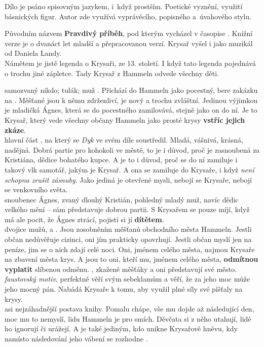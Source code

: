 \documentclass[FGBook.tex]{subfiles}
\begin{document}


\noindent Dílo je psáno spisovným jazykem, i~když prostším.
Poetické vyznění, využití básnických figur.
Autor zde využívá vyprávěcího, popisného a~úvahového stylu.

\noindent Původním názvem \textbf{Pravdivý příběh}, pod kterým vycházel v časopise .
Knižní verze je o dvanáct let mladší a přepracovanou verzí.
Krysař vyšel i jako muzikál od Daniela Landy. \\
Námětem je jistě legenda o Krysaři, ze 13. století.
I když tato legenda pojednává o trochu jiné zápletce.
Tady Krysař z Hammeln odvede všechny děti.

\noindent 
{} samozvaný nikdo; tulák; muž .
Přichází do Hammeln jako pocestný, bere zakázku na .
Měšťané jsou k němu zdrženliví, je nový a trochu zvláštní.
Jedinou výjimkou je mladičká Ágnes, která se do pocestného zamilovává, stejně jako on do ní.
Je to Krysař, který vede všechny občany Hammeln jako prosté krysy \textbf{vstříc jejich zkáze}.\\
 hlavní část , na který se \textit{Dyk} ve svém díle soustředil.
Mladá, vášnivá, krásná, nadějná.
Dobrá partie pro kohokoli ve městě, to je i důvod, proč je zasnoubená za Kristiána, dědice bohatého kupce.
A je to i důvod, proč se do ní zamiluje i takový vlk samotář, jakým je Krysař.
A ona se zamiluje do Krysaře, i když \textit{není schopna zrušit zásnuby}.
Jako jediná je otevřené mysli, nebojí se Krysaře, nebojí se venkovního světa.\\
 snoubenec Ágnes, zvaný dlouhý Kristián, pohledný mladý muž, navíc dědic velkého mění -- sám představuje dobrou partii.
S Krysařem se pouze míjí, když má ale pocit, že Ágnes ztrácí, pojistí si jí \textbf{dítětem}.\\
 dvojice mužů,  a .
Jsou zosobněním měšťanů obchodního města Hammeln.
Jestli občan nedůvěřuje cizinci, oni jím prakticky opovrhují.
Jestli občan myslí jen na peníze, jim se o nich zdají  celé noci.
Oni, jménem celého města, najmou Krysaře na zbavení města krys.
A jsou to oni, kteří mu, jménem celého města, \textbf{odmítnou vyplatit} slíbenou odměnu.
, zkažené měšťáky a oni představují své město.\\
 \textit{faustovský motiv}, perfektně věří svým sebeklamům a věří, že za jeho moc může jeho mocný pán.
Nabádá Krysaře k tomu, aby využil plné síly své píšťaly na krysy.\\
 asi nejzáhadnější postava knihy.
Pomalu chápe, vše mu dojde až následující den, moc mu to nemyslí, lidu Hammeln je pro smích.
Děvčata si z něho utahují, lidé ho ignorují či urážejí.
A je také jediným, kdo unikne Krysařově hněvu, kdy namísto následování jeho vábení se rozhodne .
\end{document}
